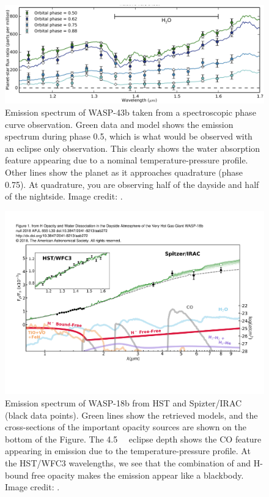 \begin{figure}
    \centering
    \includegraphics[width = \linewidth]{Wasp-43b_water.png}
    \caption{Emission spectrum of WASP-43b taken from a spectroscopic phase curve observation. Green data and model shows the emission spectrum during phase 0.5, which is what would be observed with an eclipse only observation. This clearly shows the water absorption feature appearing due to a nominal temperature-pressure profile. Other lines show the planet as it approaches quadrature (phase 0.75). At quadrature, you are observing half of the dayside and half of the nightside. Image credit: \citet{Stevenson2014c}.}
    \label{int:fig:w43}
\end{figure}

\begin{figure}
    \centering
    \includegraphics[width = \linewidth]{arcangeli+18.pdf}
    \caption{Emission spectrum of WASP-18b from HST and Spizter/IRAC (black data points). Green lines show the retrieved models, and the cross-sections of the important opacity sources are shown on the bottom of the Figure. The 4.5~\um~ \spitzer eclipse depth shows the CO feature appearing in emission due to the temperature-pressure profile. At the HST/WFC3 wavelengths, we see that the combination of  and H- bound free opacity makes the emission appear like a blackbody. Image credit: \citet{Arcangeli2018}. }
    \label{int:fig:w18}
\end{figure}

